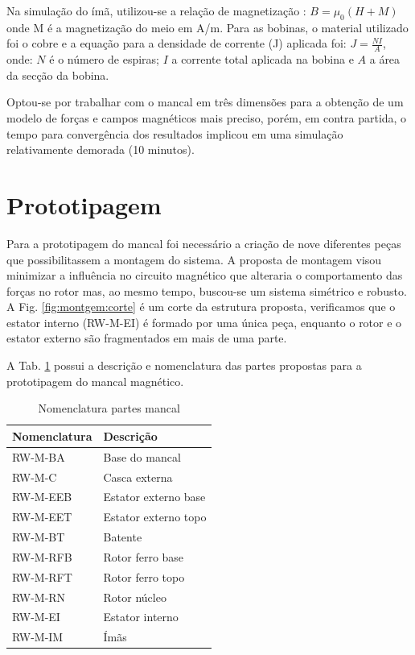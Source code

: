 Na simulação do ímã, utilizou-se a relação de magnetização : $B = \mu_0 (H + M)$ onde M é a magnetização do meio em A/m. Para as bobinas, o material utilizado foi o cobre e a equação para a densidade de corrente (J) aplicada foi: $ J = \frac{N I}{A}$, onde: $N$ é o número de espiras; $I$ a corrente total aplicada na bobina e $A$ a área da secção da bobina.

Optou-se por trabalhar com o mancal em três dimensões para a obtenção de um modelo de forças e campos magnéticos mais preciso, porém, em contra partida, o tempo para convergência dos resultados implicou em uma simulação relativamente demorada (10 minutos).


\section{Prototipagem}
 
Para a prototipagem do mancal foi necessário a criação de nove diferentes peças que possibilitassem a montagem do sistema. A proposta de montagem visou minimizar a influência no circuito magnético que alteraria o comportamento das forças no rotor mas, ao mesmo tempo, buscou-se um sistema simétrico e robusto.  A Fig. \ref{fig:montgem:corte} é um corte da estrutura proposta, verificamos que o estator interno (RW-M-EI) é formado por uma única peça, enquanto o rotor e o estator externo são fragmentados em mais de uma parte.

A Tab. \ref{Tab:nomenclatura:mancal} possui a descrição e nomenclatura das partes propostas para a prototipagem do mancal magnético.

 \begin{table}[ht!]
 	\centering
 	\begin{tabular}{l l}
 		Nomenclatura & Descrição  \\ \hline
 		RW-M-BA 		&	Base do mancal \\
 		RW-M-C   		 &	Casca externa\\
 		RW-M-EEB	  & Estator externo base\\
 		RW-M-EET & 	Estator externo topo\\
 		RW-M-BT & 	Batente\\
 		RW-M-RFB & 	Rotor ferro base\\
 		RW-M-RFT	&  Rotor ferro topo\\
 		RW-M-RN & 	Rotor núcleo\\
 		RW-M-EI	&  Estator interno\\
		RW-M-IM	&  Ímãs 
 	\end{tabular} 
 	\caption{Nomenclatura partes mancal}
 	\label{Tab:nomenclatura:mancal} 
 \end{table} 

